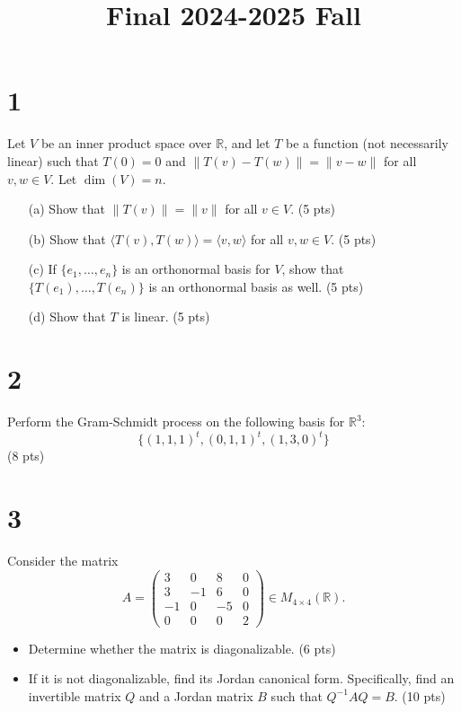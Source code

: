 \documentclass{article}
\begin{document}
\title{Final 2024-2025 Fall}
\date{}
\maketitle

\section*{1}
Let \( V \) be an inner product space over \( \mathbb{R} \), and let \( T \) be a function (not necessarily linear) such that \( T(0) = 0 \) and \( \|T(v) - T(w)\| = \|v - w\| \) for all \( v, w \in V \). Let \( \dim(V) = n \).

\begin{enumerate}
    \item[(a)] Show that \( \|T(v)\| = \|v\| \) for all \( v \in V \). (5 pts)
    \item[(b)] Show that \( \langle T(v), T(w) \rangle = \langle v, w \rangle \) for all \( v, w \in V \). (5 pts)
    \item[(c)] If \( \{e_1, \dots, e_n\} \) is an orthonormal basis for \( V \), show that \( \{T(e_1), \dots, T(e_n)\} \) is an orthonormal basis as well. (5 pts)
    \item[(d)] Show that \( T \) is linear. (5 pts)
\end{enumerate}

\section*{2}
Perform the Gram-Schmidt process on the following basis for \( \mathbb{R}^3 \):
\[
\{(1, 1, 1)^t, (0, 1, 1)^t, (1, 3, 0)^t\}
\]
(8 pts)

\section*{3}
Consider the matrix
\[
A = 
\begin{pmatrix}
3 & 0 & 8 & 0 \\
3 & -1 & 6 & 0 \\
-1 & 0 & -5 & 0 \\
0 & 0 & 0 & 2
\end{pmatrix} \in M_{4 \times 4}(\mathbb{R}).
\]

\begin{itemize}
    \item Determine whether the matrix is diagonalizable. (6 pts)
    \item If it is not diagonalizable, find its Jordan canonical form. Specifically, find an invertible matrix \( Q \) and a Jordan matrix \( B \) such that \( Q^{-1} A Q = B \). (10 pts)
\end{itemize}
\end{document}
